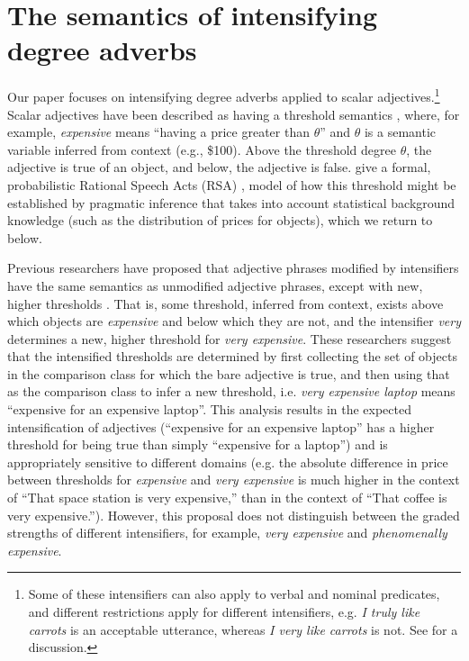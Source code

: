 \documentclass[10pt,letterpaper]{article}
\newcommand{\w}[1]{\emph{#1}}
\begin{document}
\section{The semantics of intensifying degree adverbs}

Our paper focuses on intensifying degree adverbs applied to scalar adjectives.\footnote{
  Some of these intensifiers can also apply to verbal and nominal predicates, and different restrictions apply for different intensifiers, e.g. \w{I truly like carrots} is an acceptable utterance, whereas \w{I very like carrots} is not. See  for a discussion.
 }
Scalar adjectives have been described as having a threshold semantics \cite{kennedy}, where, for example, \w{expensive} means ``having a price greater than $\theta$'' and $\theta$ is a semantic variable inferred from context (e.g., \$100). Above the threshold degree $\theta$, the adjective is true of an object, and below, the adjective is false.  give a formal, probabilistic Rational Speech Acts (RSA) \cite{frank,goodman}, model of how this threshold might be established by pragmatic inference that takes into account statistical background knowledge (such as the distribution of prices for objects), which we return to below.

Previous researchers have proposed that adjective phrases modified by intensifiers have the same semantics as unmodified adjective phrases, except with new, higher thresholds \cite{kennedyMcnally, klein, wheeler}. That is, some threshold, inferred from context, exists above which objects are \w{expensive} and below which they are not, and the intensifier \w{very} determines a new, higher threshold for \w{very expensive}.
These researchers suggest that the intensified thresholds are determined by first collecting the set of objects in the comparison class for which the bare adjective is true, and then using that as the comparison class to infer a new threshold, i.e. \w{very expensive laptop} means ``expensive for an expensive laptop''. This analysis results in the expected intensification of adjectives (``expensive for an expensive laptop'' has a higher threshold for being true than simply ``expensive for a laptop'') and is appropriately sensitive to different domains (e.g. the absolute difference in price between thresholds for \w{expensive} and \w{very expensive} is much higher in the context of ``That space station is very expensive,'' than in the context of ``That coffee is very expensive.'').
However, this proposal does not distinguish between the graded strengths of different intensifiers, for example, \w{very expensive} and \w{phenomenally expensive}.
\end{document}
